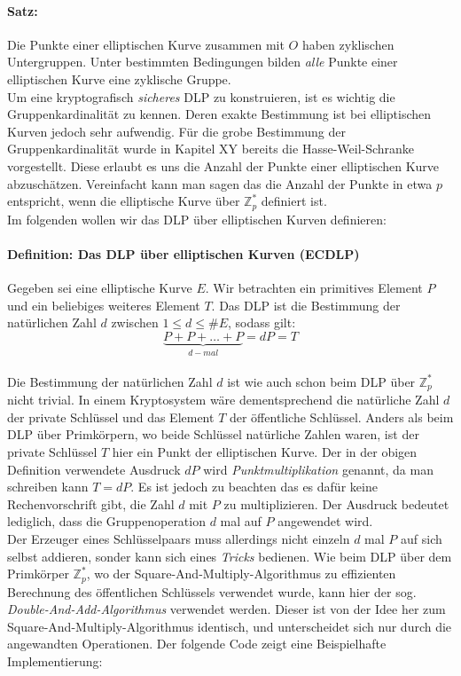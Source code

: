 \paragraph{Satz:}
Die Punkte einer elliptischen Kurve zusammen mit $O$ haben zyklischen Untergruppen. Unter bestimmten Bedingungen bilden \textit{alle} Punkte einer elliptischen Kurve eine zyklische Gruppe.\\

Um eine kryptografisch \textit{sicheres} DLP zu konstruieren, ist es wichtig die Gruppenkardinalität zu kennen. Deren exakte Bestimmung ist bei elliptischen Kurven jedoch sehr aufwendig. Für die grobe Bestimmung der Gruppenkardinalität wurde in Kapitel XY bereits die Hasse-Weil-Schranke vorgestellt. Diese erlaubt es uns die Anzahl der Punkte einer elliptischen Kurve abzuschätzen. Vereinfacht kann man sagen das die Anzahl der Punkte in etwa $p$ entspricht, wenn die elliptische Kurve über $\mathbb{Z}^*_p$ definiert ist.\\

Im folgenden wollen wir das DLP über elliptischen Kurven definieren:

\paragraph{Definition: Das DLP über elliptischen Kurven (ECDLP)}
Gegeben sei eine elliptische Kurve $E$. Wir betrachten ein primitives Element $P$ und ein beliebiges weiteres Element $T$. Das DLP ist die Bestimmung der natürlichen Zahl $d$ zwischen $1 \leq d \leq \#E$, sodass gilt:
$$\underbrace{P + P + \dots + P}_{d-mal} = d P = T$$\\

Die Bestimmung der natürlichen Zahl $d$ ist wie auch schon beim DLP über $\mathbb{Z}^*_p$ nicht trivial. In einem Kryptosystem wäre dementsprechend die natürliche Zahl $d$ der private Schlüssel und das Element $T$ der öffentliche Schlüssel. Anders als beim DLP über Primkörpern, wo beide Schlüssel natürliche Zahlen waren, ist der private Schlüssel $T$ hier ein Punkt der elliptischen Kurve. Der in der obigen Definition verwendete Ausdruck $dP$ wird \textit{Punktmultiplikation} genannt, da man schreiben kann $T = dP$. Es ist jedoch zu beachten das es dafür keine Rechenvorschrift gibt, die Zahl $d$ mit $P$ zu multiplizieren. Der Ausdruck bedeutet lediglich, dass die Gruppenoperation $d$ mal auf $P$ angewendet wird.\\

Der Erzeuger eines Schlüsselpaars muss allerdings nicht einzeln $d$ mal $P$ auf sich selbst addieren, sonder kann sich eines \textit{Tricks} bedienen. Wie beim DLP über dem Primkörper $\mathbb{Z}^*_p$, wo der Square-And-Multiply-Algorithmus zu effizienten Berechnung des öffentlichen Schlüssels verwendet wurde, kann hier der sog. \textit{Double-And-Add-Algorithmus} verwendet werden. Dieser ist von der Idee her zum Square-And-Multiply-Algorithmus identisch, und unterscheidet sich nur durch die angewandten Operationen. Der folgende Code zeigt eine Beispielhafte Implementierung:

